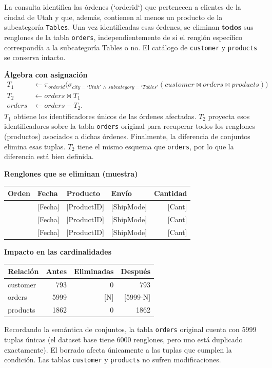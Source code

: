 La consulta identifica las órdenes (`orderid`) que pertenecen a clientes de la ciudad de Utah y que, además, contienen al menos un producto de la subcategoría \texttt{Tables}. Una vez identificadas esas órdenes, se eliminan \textbf{todos} sus renglones de la tabla \texttt{orders}, independientemente de si el renglón específico correspondía a la subcategoría Tables o no. El catálogo de \texttt{customer} y \texttt{products} se conserva intacto.

\textbf{Álgebra con asignación}
\begin{align*}
T_1 &\leftarrow \pi_{orderid} \Big( \sigma_{city='Utah' \,\land\, subcategory='Tables'} (customer \bowtie orders \bowtie products) \Big)\\
T_2 &\leftarrow orders \bowtie T_1\\
orders &\leftarrow orders - T_2.
\end{align*}
$T_1$ obtiene los identificadores únicos de las órdenes afectadas. $T_2$ proyecta esos identificadores sobre la tabla \texttt{orders} original para recuperar todos los renglones (productos) asociados a dichas órdenes. Finalmente, la diferencia de conjuntos elimina esas tuplas. $T_2$ tiene el mismo esquema que \texttt{orders}, por lo que la diferencia está bien definida.

\textbf{Renglones que se eliminan (muestra)}
\begin{center}\scriptsize\begin{tabular}{llllr}\toprule\rowcolor{Fondo} Orden & Fecha & Producto & Envío & Cantidad\\\midrule
[US-XXXX-XXXXXX] & [Fecha] & [ProductID] & [ShipMode] & [Cant]\\
[US-XXXX-XXXXXX] & [Fecha] & [ProductID] & [ShipMode] & [Cant]\\
[US-XXXX-XXXXXX] & [Fecha] & [ProductID] & [ShipMode] & [Cant]\\
\bottomrule\end{tabular}\end{center}

\textbf{Impacto en las cardinalidades}
\begin{center}\begin{tabular}{lrrr}\toprule\rowcolor{Fondo} Relación & Antes & Eliminadas & Después\\\midrule
customer & 793 & 0 & 793\\
orders & 5999 & [N] & [5999-N]\\
products & 1862 & 0 & 1862\\\bottomrule\end{tabular}\end{center}
Recordando la semántica de conjuntos, la tabla \texttt{orders} original cuenta con 5999 tuplas únicas (el dataset base tiene 6000 renglones, pero uno está duplicado exactamente). El borrado afecta únicamente a las tuplas que cumplen la condición. Las tablas \texttt{customer} y \texttt{products} no sufren modificaciones.

